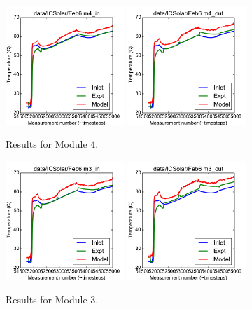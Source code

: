 \documentclass{article}
\begin{document}
\clearpage
\begin{figure}[!ht]
\centering
\includegraphics[width=0.4\textwidth]{../../data/ICSolar/images/Feb6_m4_in_unsteady.pdf}\hspace{0.05\textwidth}
\includegraphics[width=0.4\textwidth]{../../data/ICSolar/images/Feb6_m4_out_unsteady.pdf}\hspace{0.05\textwidth}\\
\caption{Results for Module 4.}\end{figure}
\begin{figure}[!ht]
\centering
\includegraphics[width=0.4\textwidth]{../../data/ICSolar/images/Feb6_m3_in_unsteady.pdf}\hspace{0.05\textwidth}
\includegraphics[width=0.4\textwidth]{../../data/ICSolar/images/Feb6_m3_out_unsteady.pdf}\hspace{0.05\textwidth}\\
\caption{Results for Module 3.}\end{figure}
\end{document}
